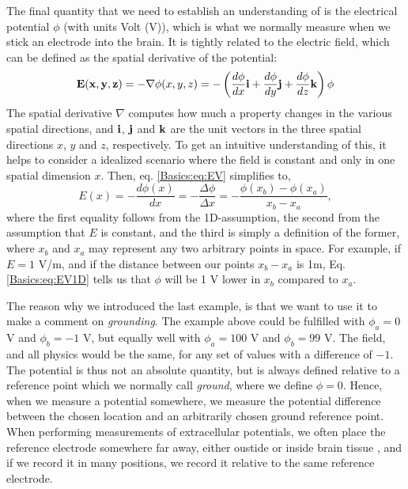 The final quantity that we need to establish an understanding of is the electrical potential $\phi$ (with units Volt (V)), which is what we normally measure when we stick an electrode into the brain. It is tightly related to the electric field, which can be defined as the spatial derivative of the potential:
\begin{equation}
{\bf E(x,y,z)} = - \nabla \phi(x,y,z) = - \left(\frac{d\phi}{dx} {\bf i}  + \frac{d\phi}{dy} {\bf j} + \frac{d\phi}{dz} {\bf k} \right)
\phi 
\label{Basics:eq:EV}
\end{equation}
The spatial derivative $\nabla$ computes how much a property changes in the various spatial directions, and ${\bf i}$, ${\bf j}$ and  ${\bf k}$ are the unit vectors in the three spatial directions $x$, $y$ and $z$, respectively. To get an intuitive understanding of this, it helps to consider a idealized scenario where the field is constant and only in one spatial dimension $x$. Then, eq. \ref{Basics:eq:EV} simplifies to,
\begin{equation}
E(x) = -\frac{d\phi(x)}{dx} = -\frac{\Delta \phi}{\Delta x} = -\frac{\phi(x_b)-\phi(x_a)}{x_b-x_a},
\label{Basics:eq:EV1D}
\end{equation}
where the first equality follows from the 1D-assumption, the second from the assumption that $E$ is constant, and the third is simply a definition of the former, where $x_b$ and $x_a$ may represent any two arbitrary points in space. For example, if $E = 1$ V/m, and if the distance between our points $x_b-x_a$ is 1m, Eq. \ref{Basics:eq:EV1D} tells us that $\phi$ will be 1 V  lower in $x_b$ compared to $x_a$.

The reason why we introduced the last example, is that we want to use it to make a comment on \textit{grounding}. The example above could be fulfilled with $\phi_a = 0$ V and $\phi_b = -1$ V, but equally well with $\phi_a = 100$ V and $\phi_b = 99$ V. The field, and all physics would be the same, for any set of values with a difference of $-1$. The potential is thus not an absolute quantity, but is always defined relative to a reference point which we normally call \textit{ground}, where we define $\phi = 0$. Hence, when we measure a potential somewhere, we measure the potential difference between the chosen location and an arbitrarily chosen ground reference point. When performing measurements of extracellular potentials, we often place the reference electrode somewhere far away, either oustide or inside brain tissue \cite{Sharott2015}, and if we record it in many positions, we record it relative to the same reference electrode. 




